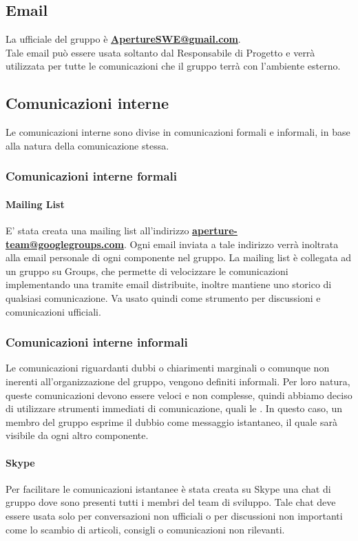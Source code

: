 \subsection{Email}
\label{3.1}
La  ufficiale del gruppo è \textbf{\url{ApertureSWE@gmail.com}}.\\
Tale email può essere usata soltanto dal Responsabile di Progetto e verrà utilizzata per tutte le comunicazioni che il gruppo terrà con l'ambiente esterno.

\subsection{Comunicazioni interne}
\label{3.2}
Le comunicazioni interne sono divise in comunicazioni formali e informali, in base alla natura della comunicazione stessa.

\subsubsection{Comunicazioni interne formali}

\paragraph{Mailing List}
\label{3.2.2}
E' stata creata una mailing list all'indirizzo \textbf{\url{aperture-team@googlegroups.com}}.
Ogni email inviata a tale indirizzo verrà inoltrata alla email personale di ogni componente nel gruppo.
La mailing list è collegata ad un gruppo su  Groups, che permette di velocizzare le comunicazioni implementando una  tramite email distribuite, inoltre mantiene uno storico di qualsiasi comunicazione. Va usato quindi come strumento per discussioni e comunicazioni ufficiali.


\subsubsection{Comunicazioni interne informali}
Le comunicazioni riguardanti dubbi o chiarimenti marginali o comunque non inerenti all'organizzazione del gruppo, vengono definiti informali. Per loro natura, queste comunicazioni devono essere veloci e non complesse, quindi abbiamo deciso di utilizzare strumenti immediati di comunicazione, quali le . In questo caso, un membro del gruppo esprime il dubbio come messaggio istantaneo, il quale sarà visibile da ogni altro componente. 
 
\paragraph{Skype}
\label{3.2.1}
Per facilitare le comunicazioni istantanee è stata creata su Skype una chat di gruppo dove sono presenti tutti i membri del team di sviluppo. Tale chat deve essere usata solo per conversazioni non ufficiali o per discussioni non importanti come lo scambio di articoli, consigli o comunicazioni non rilevanti.

